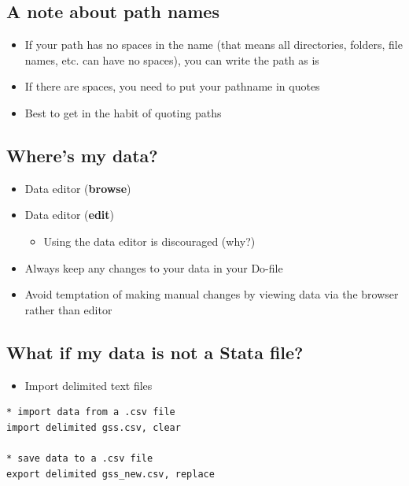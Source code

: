 \documentclass[]{book}
\providecommand{\tightlist}{%
  \setlength{\itemsep}{0pt}\setlength{\parskip}{0pt}}
\begin{document}
\subsection{A note about path names}\label{a-note-about-path-names}

\begin{itemize}
\tightlist
\item
  If your path has no spaces in the name (that means all directories,
  folders, file names, etc. can have no spaces), you can write the path
  as is
\item
  If there are spaces, you need to put your pathname in quotes
\item
  Best to get in the habit of quoting paths
\end{itemize}

\subsection{Where's my data?}\label{wheres-my-data}

\begin{itemize}
\tightlist
\item
  Data editor (\textbf{browse})
\item
  Data editor (\textbf{edit})

  \begin{itemize}
  \tightlist
  \item
    Using the data editor is discouraged (why?)
  \end{itemize}
\item
  Always keep any changes to your data in your Do-file
\item
  Avoid temptation of making manual changes by viewing data via the
  browser rather than editor
\end{itemize}

\subsection{What if my data is not a Stata
file?}\label{what-if-my-data-is-not-a-stata-file}

\begin{itemize}
\tightlist
\item
  Import delimited text files
\end{itemize}

\begin{verbatim}
* import data from a .csv file
import delimited gss.csv, clear

* save data to a .csv file
export delimited gss_new.csv, replace
\end{verbatim}
\end{document}
